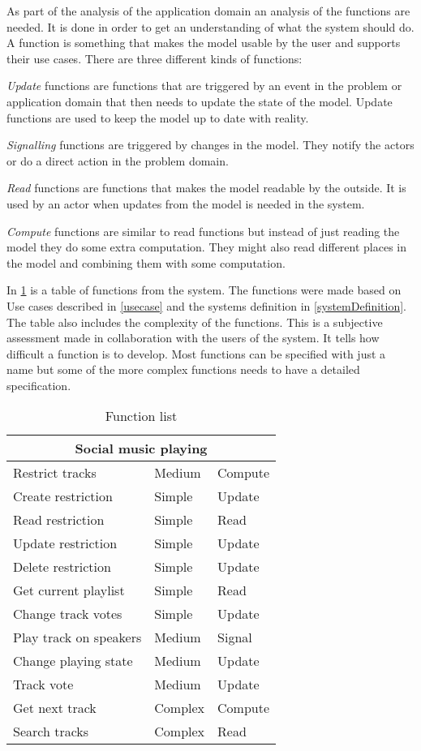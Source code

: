 As part of the analysis of the application domain an analysis of the functions are needed. It is done in order to get an understanding of what the system should do. A function is something that makes the model usable by the user and supports their use cases. There are three different kinds of functions:

\emph{Update} functions are functions that are triggered by an event in the problem or application domain that then needs to update the state of the model. Update functions are used to keep the model up to date with reality.

\emph{Signalling} functions are triggered by changes in the model. They notify the actors or do a direct action in the problem domain.

\emph{Read} functions are functions that makes the model readable by
the outside. It is used by an actor when updates from the model is needed in the system.

\emph{Compute} functions are similar to read functions but instead of just reading the model they do some extra computation. They might also read different places in the model and combining them with some computation.

In \cref{table:functionlist} is a table of functions from the system. The functions were made based on Use cases described in \cref{usecase} and the systems definition in \cref{systemDefinition}. The table also includes the complexity of the functions. This is a subjective assessment made in collaboration with the users of the system. It tells how difficult a function is to develop. Most functions can be specified with just a name but some of the more complex functions needs to have a detailed specification.

\begin{table}[h]
\centering
\begin{tabular}{lll}
\toprule
\multicolumn{3}{c}{\textbf{Social music playing}} \\
\midrule
Restrict tracks                & Medium  & Compute \\
Create restriction             & Simple  & Update  \\
Read restriction               & Simple  & Read    \\
Update restriction             & Simple  & Update  \\
Delete restriction             & Simple  & Update  \\
Get current playlist           & Simple  & Read    \\
Change track votes             & Simple  & Update  \\
Play track on speakers         & Medium  & Signal  \\
Change playing state           & Medium  & Update  \\
Track vote                     & Medium  & Update  \\
Get next track                 & Complex & Compute \\
Search tracks                  & Complex & Read    \\
\bottomrule
\end{tabular}
\caption{Function list}
\label{table:functionlist}
\end{table}

